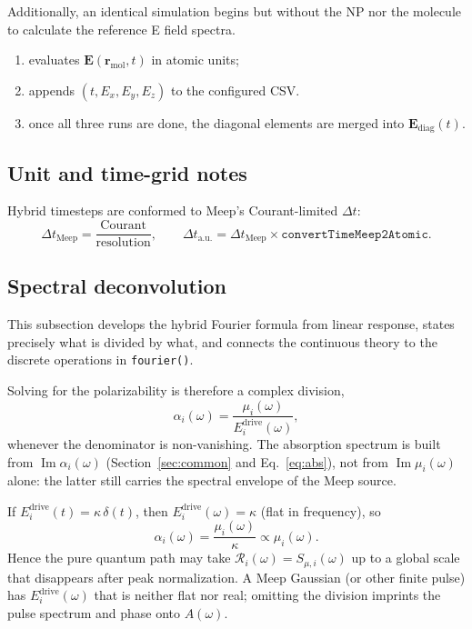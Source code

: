 \documentclass[11pt,a4paper]{article}
\begin{document}
\noindent Additionally, an identical simulation begins but without the NP nor the molecule 
to calculate the reference E field spectra.
\begin{enumerate}
  \item evaluates $\mathbf{E}(\mathbf{r}_{\mathrm{mol}}, t)$ in atomic units;
  \item appends $(t, E_x, E_y, E_z)$ to the configured CSV.
  \item once all three runs are done, the diagonal elements are merged into \( \mathbf{E}_{\text{diag}}(t) \).
\end{enumerate}

\subsection{Unit and time-grid notes}

Hybrid timesteps are conformed to Meep's Courant-limited $\Delta t$:
\begin{equation}
  \Delta t_{\mathrm{Meep}} = \frac{\mathrm{Courant}}{\mathrm{resolution}},
  \qquad
  \Delta t_{\mathrm{a.u.}}
  =
  \Delta t_{\mathrm{Meep}}
  \times
  \texttt{convertTimeMeep2Atomic}.
\end{equation}

\subsection{Spectral deconvolution}
\label{sec:deconv}

This subsection develops the hybrid Fourier formula from linear response,
states precisely what is divided by what, and connects the continuous
theory to the discrete operations in \texttt{fourier()}.

Solving for the polarizability is therefore a complex division,
\begin{equation}
  \alpha_i(\omega)
  =
  \frac{\mu_i(\omega)}{E_i^{\mathrm{drive}}(\omega)},
  \label{eq:alpha-def}
\end{equation}
whenever the denominator is non-vanishing.  The absorption spectrum is
built from $\operatorname{Im}\alpha_i(\omega)$ (Section~\ref{sec:common}
and Eq.~\eqref{eq:abs}), not from $\operatorname{Im}\mu_i(\omega)$ alone:
the latter still carries the spectral envelope of the Meep source.

If $E_i^{\mathrm{drive}}(t) = \kappa\,\delta(t)$, then
$E_i^{\mathrm{drive}}(\omega) = \kappa$ (flat in frequency), so
\begin{equation}
  \alpha_i(\omega)
  =
  \frac{\mu_i(\omega)}{\kappa}
  \propto
  \mu_i(\omega).
\end{equation}
Hence the pure quantum path may take
$\mathcal{R}_i(\omega) = S_{\mu,i}(\omega)$ up to a global scale that
disappears after peak normalization.  A Meep Gaussian (or other finite
pulse) has $E_i^{\mathrm{drive}}(\omega)$ that is neither flat nor
real; omitting the division imprints the pulse spectrum and phase onto
$A(\omega)$.
\end{document}
